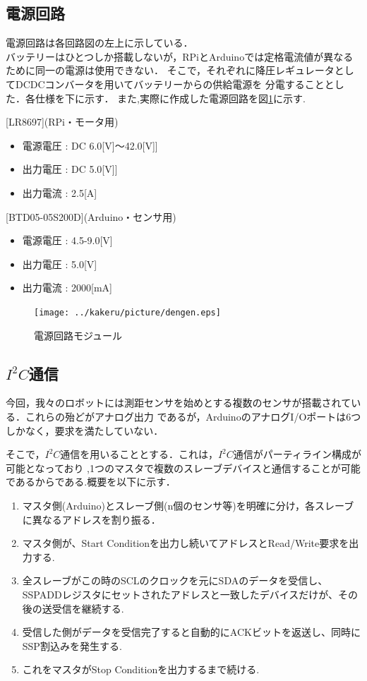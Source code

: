 \subsection{電源回路}
電源回路は各回路図の左上に示している．\\
バッテリーはひとつしか搭載しないが，RPiとArduinoでは定格電流値が異なるために同一の電源は使用できない．
そこで，それぞれに降圧レギュレータとしてDCDCコンバータを用いてバッテリーからの供給電源を
分電することとした．各仕様を下に示す．
また,実際に作成した電源回路を図\ref{dengen}に示す.

[LR8697](RPi・モータ用)
\begin{itemize}
 \item 電源電圧 : DC 6.0[V]$〜$42.0[V]]
 \item 出力電圧 : DC 5.0[V]]
 \item 出力電流 : 2.5[A]
\end{itemize}

[BTD05-05S200D](Arduino・センサ用)
\begin{itemize}
 \item 電源電圧 : 4.5-9.0[V]
 \item 出力電圧 : 5.0[V]
 \item 出力電流 : 2000[mA]
\end{itemize}
\begin{figure}[t]
 \centering
 \texttt{[image: ../kakeru/picture/dengen.eps]}
    \caption{電源回路モジュール}
    \label{dengen}
\end{figure}
\newpage
\subsection{$I^2 C$通信}
今回，我々のロボットには測距センサを始めとする複数のセンサが搭載されている．これらの殆どがアナログ出力
であるが，ArduinoのアナログI/Oポートは6つしかなく，要求を満たしていない．

そこで，$I^2 C$通信を用いることとする．これは，$I^2 C$通信がパーティライン構成が可能となっており
,1つのマスタで複数のスレーブデバイスと通信することが可能であるからである.概要を以下に示す．
\begin{enumerate}
 \item マスタ側(Arduino)とスレーブ側(n個のセンサ等)を明確に分け，各スレーブに異なるアドレスを割り振る．
 \item マスタ側が、Start Conditionを出力し続いてアドレスとRead/Write要求を出力する.
 \item 全スレーブがこの時のSCLのクロックを元にSDAのデータを受信し、SSPADDレジスタにセットされたアドレスと一致したデバイスだけが、その後の送受信を継続する.
 \item 受信した側がデータを受信完了すると自動的にACKビットを返送し、同時にSSP割込みを発生する.
 \item これをマスタがStop Conditionを出力するまで続ける.
\end{enumerate}

